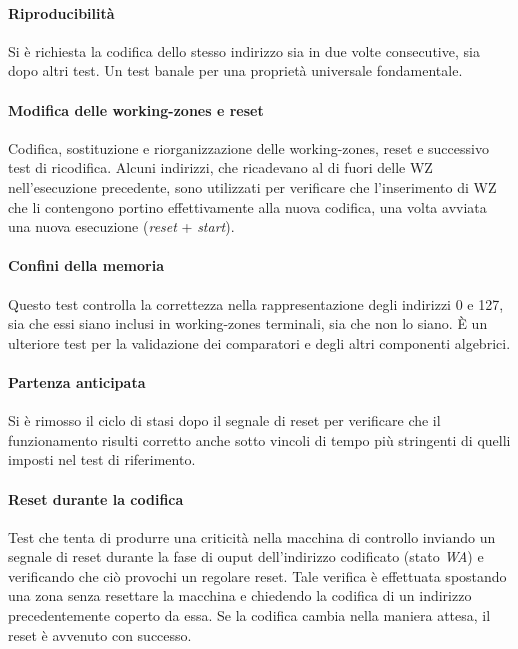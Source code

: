 \documentclass[11pt,a4paper]{article}
\begin{document}
\paragraph{Riproducibilità}
Si è richiesta la codifica dello stesso indirizzo sia in due volte consecutive, sia dopo altri test. Un test banale per una proprietà universale
fondamentale.

\paragraph{Modifica delle working-zones e reset}
Codifica, sostituzione e riorganizzazione delle working-zones, reset e successivo test di ricodifica. Alcuni indirizzi, che ricadevano al di fuori delle WZ
nell'esecuzione precedente, sono utilizzati per verificare che l'inserimento di WZ che li contengono portino effettivamente alla nuova codifica, una volta
avviata una nuova esecuzione (\emph{reset} + \emph{start}).

\paragraph{Confini della memoria}
Questo test controlla la correttezza nella rappresentazione degli indirizzi 0 e 127, sia che essi siano inclusi in working-zones terminali, sia che non lo
siano. È un ulteriore test per la validazione dei comparatori e degli altri componenti algebrici.

\paragraph{Partenza anticipata}
Si è rimosso il ciclo di stasi dopo il segnale di reset per verificare che il funzionamento risulti corretto anche sotto vincoli di tempo più stringenti di
quelli imposti nel test di riferimento.

\paragraph{Reset durante la codifica}
Test che tenta di produrre una criticità nella macchina di controllo inviando un segnale di reset durante la fase di ouput dell'indirizzo codificato (stato
\emph{WA}) e verificando che ciò provochi un regolare reset. Tale verifica è effettuata spostando una zona senza resettare la macchina e chiedendo la
codifica di un indirizzo precedentemente coperto da essa. Se la codifica cambia nella maniera attesa, il reset è avvenuto con successo.
\end{document}
